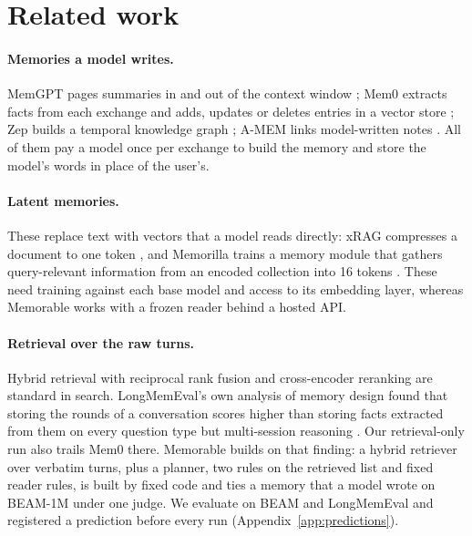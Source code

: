 \section{Related work}
\label{sec:related}

\paragraph{Memories a model writes.} MemGPT pages summaries in and out of the context window \citep{packer2023memgpt}; Mem0 extracts facts from each exchange and adds, updates or deletes entries in a vector store \citep{chhikara2025mem0}; Zep builds a temporal knowledge graph \citep{rasmussen2025zep}; A-MEM links model-written notes \citep{xu2025amem}. All of them pay a model once per exchange to build the memory and store the model's words in place of the user's.

\paragraph{Latent memories.} These replace text with vectors that a model reads directly: xRAG compresses a document to one token \citep{cheng2024xrag}, and Memorilla trains a memory module that gathers query-relevant information from an encoded collection into 16 tokens \citep{fallahpour2026memorilla}. These need training against each base model and access to its embedding layer, whereas Memorable works with a frozen reader behind a hosted API.

\paragraph{Retrieval over the raw turns.} Hybrid retrieval with reciprocal rank fusion \citep{cormack2009rrf} and cross-encoder reranking \citep{chen2024bgem3} are standard in search. LongMemEval's own analysis of memory design found that storing the rounds of a conversation scores higher than storing facts extracted from them on every question type but multi-session reasoning \citep{wu2025longmemeval}. Our retrieval-only run also trails Mem0 there. Memorable builds on that finding: a hybrid retriever over verbatim turns, plus a planner, two rules on the retrieved list and fixed reader rules, is built by fixed code and ties a memory that a model wrote on BEAM-1M under one judge. We evaluate on BEAM \citep{beam2026} and LongMemEval \citep{wu2025longmemeval} and registered a prediction before every run (Appendix~\ref{app:predictions}).
